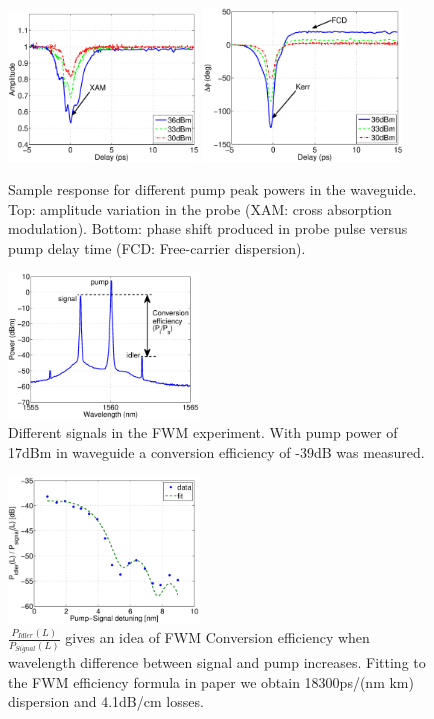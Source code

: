\documentclass[conference]{IEEEtran}
\begin{document}
\begin{figure}[htb]
    \centering
    \includegraphics[width=0.45\textwidth]{p01amp_text}
	\includegraphics[width=0.47\textwidth]{p01phase_text}
    \caption{Sample response for different pump peak powers in the waveguide. Top: amplitude variation in the probe (XAM: cross absorption modulation). Bottom: phase shift produced in probe pulse versus pump delay time (FCD: Free-carrier dispersion).}
    \label{fig:p01}
\end{figure}

\begin{figure}[htb]
    \centering
    \includegraphics[width=0.45\textwidth]{maxEfficiency}
    \caption{Different signals in the FWM experiment. With pump power of 17dBm in waveguide a conversion efficiency of -39dB was measured.}
    \label{fig:fwmMaxEfficiency}
\end{figure}


\begin{figure}[htb]
    \centering
    \includegraphics[width=0.45\textwidth]{fwmBwfit_big}
    \caption{$ \frac{P_{Idler}(L)}{P_{Signal}(L)}$ gives an idea of FWM Conversion efficiency when wavelength difference between signal and pump increases. Fitting to the FWM efficiency formula in paper \cite{Vallaitis} we obtain 18300ps/(nm km) dispersion and 4.1dB/cm losses.}
    \label{fig:fwmBw}
\end{figure}
\end{document}
